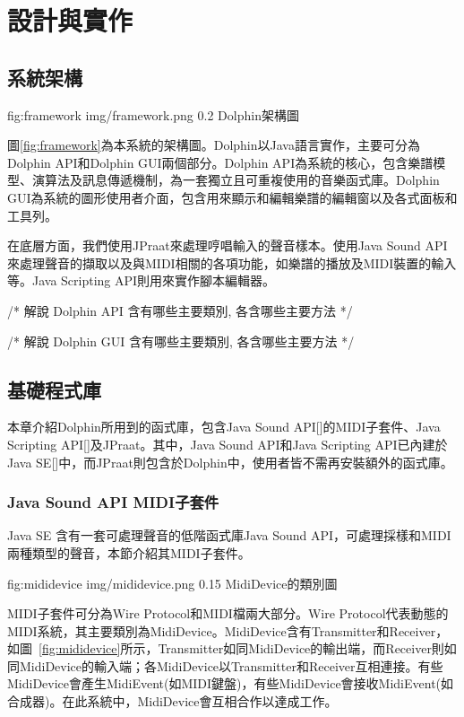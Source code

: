 \documentclass[12pt,a4paper,oneside]{report}
\begin{document}
\chapter{設計與實作} 

\section{系統架構}


\figurewithcaption
{fig:framework}
{img/framework.png}
{0.2}
{Dolphin架構圖}

圖\ref{fig:framework}為本系統的架構圖。Dolphin以Java語言實作，主要可分為Dolphin API和Dolphin GUI兩個部分。Dolphin API為系統的核心，包含樂譜模型、演算法及訊息傳遞機制，為一套獨立且可重複使用的音樂函式庫。Dolphin GUI為系統的圖形使用者介面，包含用來顯示和編輯樂譜的編輯窗以及各式面板和工具列。

在底層方面，我們使用JPraat來處理哼唱輸入的聲音樣本。使用Java Sound API來處理聲音的擷取以及與MIDI相關的各項功能，如樂譜的播放及MIDI裝置的輸入等。Java Scripting API則用來實作腳本編輯器。


/* 
解說 Dolphin API 含有哪些主要類別, 各含哪些主要方法
*/

/* 
解說 Dolphin GUI 含有哪些主要類別, 各含哪些主要方法
*/

\section{基礎程式庫}

本章介紹Dolphin所用到的函式庫，包含Java Sound API[]的MIDI子套件、Java Scripting API[]及JPraat。其中，Java Sound API和Java Scripting API已內建於Java SE[]中，而JPraat則包含於Dolphin中，使用者皆不需再安裝額外的函式庫。

\subsection{Java Sound API MIDI子套件}

Java SE 含有一套可處理聲音的低階函式庫Java Sound API，可處理採樣和MIDI兩種類型的聲音，本節介紹其MIDI子套件。

\figurewithcaption
{fig:mididevice}
{img/mididevice.png}
{0.15}
{MidiDevice的類別圖}

MIDI子套件可分為Wire Protocol和MIDI檔兩大部分。Wire Protocol代表動態的MIDI系統，其主要類別為MidiDevice。MidiDevice含有Transmitter和Receiver，如圖~\ref{fig:mididevice}所示，Transmitter如同MidiDevice的輸出端，而Receiver則如同MidiDevice的輸入端；各MidiDevice以Transmitter和Receiver互相連接。有些MidiDevice會產生MidiEvent(如MIDI鍵盤)，有些MidiDevice會接收MidiEvent(如合成器)。在此系統中，MidiDevice會互相合作以達成工作。
\end{document}
